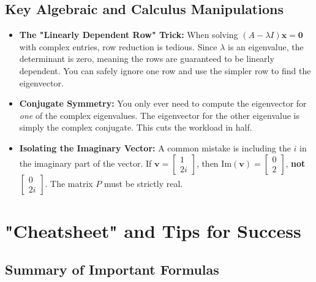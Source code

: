 \documentclass[11pt, letterpaper]{article}
\theoremstyle{definition}
\theoremstyle{remark}
\begin{document}
\subsection{Key Algebraic and Calculus Manipulations}
\begin{itemize}
    \item \textbf{The "Linearly Dependent Row" Trick:} When solving $(A - \lambda I)\mathbf{x} = \mathbf{0}$ with complex entries, row reduction is tedious. Since $\lambda$ is an eigenvalue, the determinant is zero, meaning the rows are guaranteed to be linearly dependent. You can safely ignore one row and use the simpler row to find the eigenvector.
    \item \textbf{Conjugate Symmetry:} You only ever need to compute the eigenvector for \textit{one} of the complex eigenvalues. The eigenvector for the other eigenvalue is simply the complex conjugate. This cuts the workload in half.
    \item \textbf{Isolating the Imaginary Vector:} A common mistake is including the $i$ in the imaginary part of the vector. If $\mathbf{v} = \begin{bmatrix} 1 \\ 2i \end{bmatrix}$, then $\text{Im}(\mathbf{v}) = \begin{bmatrix} 0 \\ 2 \end{bmatrix}$, \textbf{not} $\begin{bmatrix} 0 \\ 2i \end{bmatrix}$. The matrix $P$ must be strictly real.
\end{itemize}

\newpage

\section{"Cheatsheet" and Tips for Success}

\subsection{Summary of Important Formulas}
\begin{center}
\renewcommand{\arraystretch}{1.5}
\end{center}
\end{document}
